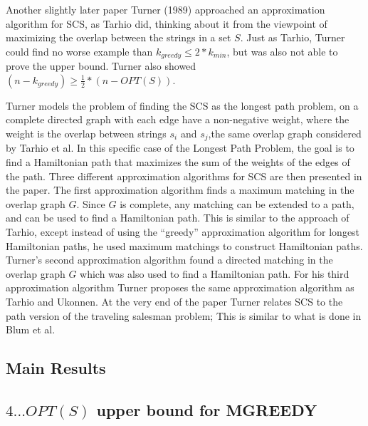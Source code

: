 \documentclass[letterpaper,11pt,titlepage]{article}
\begin{document}
Another slightly later paper Turner (1989) \cite{turner1989approximation} approached an approximation algorithm for SCS, as Tarhio did, thinking about it from the viewpoint of maximizing the overlap between the strings in a set $S$.  Just as Tarhio, Turner could find no worse example than $k_{greedy} \leq 2* k_{min}$, but was also not able to prove the upper bound.  Turner also showed $(n - k_{greedy}) \geq \frac{1}{2}*(n - OPT(S))$. 

Turner models the problem of finding the SCS as the longest path problem, on a complete directed graph with each edge have a non-negative weight, where the weight is the overlap between strings $s_i$ and $s_j$,the same overlap graph considered by Tarhio et al.  In this specific case of the Longest Path Problem, the goal is to find a Hamiltonian path that maximizes the sum of the weights of the edges of the path. 
Three different approximation algorithms for SCS are then presented in the paper. The first approximation algorithm finds a maximum matching in the overlap graph $G$.  Since $G$ is complete, any matching can be extended to a path, and can be used to find a Hamiltonian path.  This is similar to the approach of Tarhio, except instead of using the ``greedy'' approximation algorithm for longest Hamiltonian paths, he used maximum matchings to construct Hamiltonian paths.  Turner's second approximation algorithm found a directed matching in the overlap graph $G$ which was also used to find a Hamiltonian path.  For his third approximation algorithm Turner proposes the same approximation algorithm as Tarhio and Ukonnen. At the very end of the paper Turner relates SCS to the path version of the traveling salesman problem; This is similar to what is done in Blum et al. 


\subsection*{Main Results}

\subsection*{$4 \ldots OPT(S)$ upper bound for MGREEDY}
\end{document}

